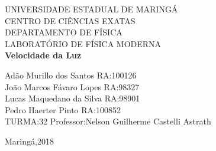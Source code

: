 \documentclass[a4paper,10pt]{article}
\begin{document}
	

\begin{titlepage}
\begin{center}
{\large UNIVERSIDADE ESTADUAL DE MARINGÁ}\\[0.2cm]
{\large CENTRO DE CIÊNCIAS EXATAS}\\[0.2cm]
{\large DEPARTAMENTO DE FÍSICA}\\[0.2cm]
{\large LABORATÓRIO DE FÍSICA MODERNA}\\[7.0cm]
{\bf \huge Velocidade da Luz}\\[7.0cm]
\end{center}
{\large Adão Murillo dos Santos \hfill RA:100126}\\[0.7cm]
{\large João Marcos Fávaro Lopes \hfill RA:98327}\\[0.7cm]
{\large Lucas Maquedano da Silva \hfill RA:98901}\\[0.7cm]
{\large Pedro Haerter Pinto \hfill RA:100852}\\[0.7cm]
{\large TURMA:32 \hfill Professor:Nelson Guilherme Castelli
Astrath}\\[1.0cm]
\begin{center}
{\large Maringá,2018}\\[0.2cm]
\end{center}
\end{titlepage}


\end{document}
